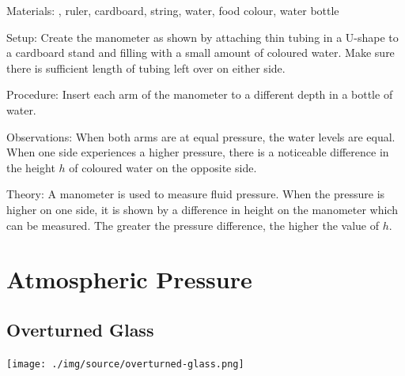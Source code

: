 \begin{multicols}{2}
\begin{description*}
\item[Materials:]{, ruler, cardboard, string, water, food colour, water bottle}
\item[Setup:]{Create the manometer as shown by attaching thin tubing in a U-shape to a cardboard stand and filling with a small amount of coloured water. Make sure there is sufficient length of tubing left over on either side.}
\item[Procedure:]{Insert each arm of the manometer to a different depth in a bottle of water.}
\item[Observations:]{When both arms are at equal pressure, the water levels are equal. When one side experiences a higher pressure, there is a noticeable difference in the height $h$ of coloured water on the opposite side.}
\item[Theory:]{A manometer is used to measure fluid pressure. When the pressure is higher on one side, it is shown by a difference in height on the manometer which can be measured. The greater the pressure difference, the higher the value of $h$.}
\end{description*}


\section*{Atmospheric Pressure}
\label{sec:atm-pressure}


\subsection{Overturned Glass}

\begin{center}
\texttt{[image: ./img/source/overturned-glass.png]}
\end{center}


\end{multicols}
